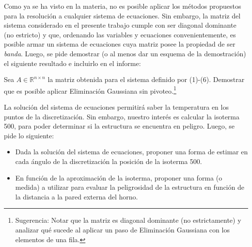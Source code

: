 Como ya se ha visto en la materia, no es posible aplicar los m\'etodos propuestos para la resoluci\'on a cualquier
sistema de ecuaciones. Sin embargo, la matriz del sistema considerado en el presente trabajo cumple con ser diagonal dominante (no
estricto) y que, ordenando las variables y ecuaciones convenientemente, es posible armar un sistema de ecuaciones cuya matriz
posee la propiedad de ser \emph{banda}. Luego, se pide demostrar (o al menos dar un esquema de la demostraci\'on)
el siguiente resultado e incluirlo en el informe:

\begin{proposition}
Sea $A \in \mathbb{R}^{n \times n}$ la matriz obtenida para el sistema definido por (1)-(6). Demostrar que es posible
aplicar Eliminaci\'on Gaussiana sin pivoteo.\footnote{Sugerencia: Notar que la matriz es diagonal dominante (no
estrictamente) y analizar qué sucede al aplicar un paso de Eliminaci\'on Gaussiana con los elementos de una fila.} 
\end{proposition}

La soluci\'on del sistema de ecuaciones permitir\'a saber la temperatura en los puntos de la discretizaci\'on. Sin embargo,
nuestro inter\'es es calcular la isoterma 500, para poder determinar si la estructura se encuentra en peligro. Luego, se pide lo siguiente:
\begin{itemize}
\item Dada la soluci\'on del sistema de ecuaciones, proponer una forma de estimar en cada \'angulo de la discretizaci\'on la posici\'on de la 
isoterma 500.
\item En funci\'on de la aproximaci\'on de la isoterma, proponer una forma (o medida) a utilizar para evaluar la peligrosidad de la estructura
en funci\'on de la distancia a la pared externa del horno.
\end{itemize}


